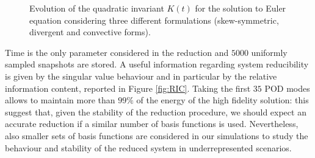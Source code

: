 \begin{figure}[h!]
  \centering
  \caption{Evolution of the quadratic invariant $K(t)$ for the solution to Euler equation considering three different formulations (skew-symmetric, divergent and convective forms).}
  \label{fig:unstable_full_models}
\end{figure}
Time is the only parameter considered in the reduction and $5000$ uniformly sampled snapshots are stored. A useful information regarding system reducibility is given by the singular value behaviour and in particular by the relative information content, reported in Figure \ref{fig:RIC}. Taking the first $35$ POD modes allows to maintain more than $99\%$ of the energy of the high fidelity solution: this suggest that, given the stability of the reduction procedure, we should expect an accurate reduction if a similar number of basis functions is used. Nevertheless, also smaller sets of basis functions are considered in our simulations to study the behaviour and stability of the reduced system in underrepresented scenarios.

